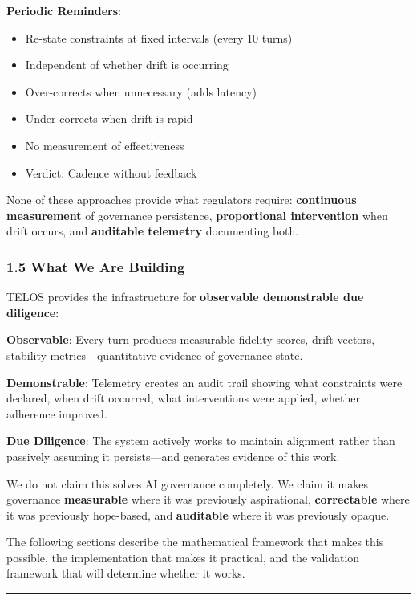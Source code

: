 \textbf{Periodic Reminders}:

\begin{itemize}
\tightlist
\item
  Re-state constraints at fixed intervals (every 10 turns)
\item
  Independent of whether drift is occurring
\item
  Over-corrects when unnecessary (adds latency)
\item
  Under-corrects when drift is rapid
\item
  No measurement of effectiveness
\item
  Verdict: Cadence without feedback
\end{itemize}

None of these approaches provide what regulators require:
\textbf{continuous measurement} of governance persistence,
\textbf{proportional intervention} when drift occurs, and
\textbf{auditable telemetry} documenting both.

\subsubsection{1.5 What We Are Building}\label{what-we-are-building}

TELOS provides the infrastructure for \textbf{observable demonstrable
due diligence}:

\textbf{Observable}: Every turn produces measurable fidelity scores,
drift vectors, stability metrics---quantitative evidence of governance
state.

\textbf{Demonstrable}: Telemetry creates an audit trail showing what
constraints were declared, when drift occurred, what interventions were
applied, whether adherence improved.

\textbf{Due Diligence}: The system actively works to maintain alignment
rather than passively assuming it persists---and generates evidence of
this work.

We do not claim this solves AI governance completely. We claim it makes
governance \textbf{measurable} where it was previously aspirational,
\textbf{correctable} where it was previously hope-based, and
\textbf{auditable} where it was previously opaque.

The following sections describe the mathematical framework that makes
this possible, the implementation that makes it practical, and the
validation framework that will determine whether it works.

\begin{center}\rule{0.5\linewidth}{0.5pt}\end{center}

